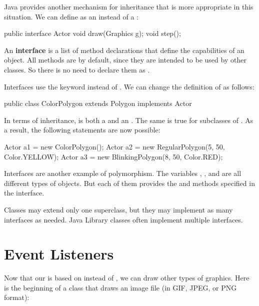
Java provides another mechanism for inheritance that is more appropriate in this situation.
We can define  as an  instead of a :

\begin{code}
public interface Actor {
    void draw(Graphics g);
    void step();
}
\end{code}


An {\bf interface} is a list of method declarations that define the capabilities of an object.
All methods are  by default, since they are intended to be used by other classes.
So there is no need to declare them as .

Interfaces use the keyword  instead of .
We can change the definition of  as follows:

\begin{code}
public class ColorPolygon extends Polygon implements Actor
\end{code}

In terms of inheritance,  is both a  and an .
The same is true for subclasses of .
As a result, the following statements are now possible:

\begin{code}
Actor a1 = new ColorPolygon();
Actor a2 = new RegularPolygon(5, 50, Color.YELLOW);
Actor a3 = new BlinkingPolygon(8, 50, Color.RED);
\end{code}


Interfaces are another example of polymorphism.
The variables , , and  are all different types of objects.
But each of them provides the  and  methods specified in the  interface.

Classes may extend only one superclass, but they may implement as many interfaces as needed.
Java Library classes often implement multiple interfaces.


\section{Event Listeners}

Now that our  is based on  instead of , we can draw other types of graphics.
Here is the beginning of a class that draws an image file (in GIF, JPEG, or PNG format):

